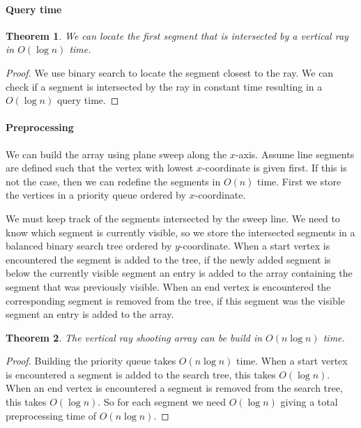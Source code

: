 \documentclass[10pt,a4paper,final,oneside,openany,article]{memoir}
\newtheorem{rayshooting}{Theorem}
\begin{document}
\paragraph{Query time}
\begin{rayshooting}
  We can locate the first segment that is intersected by a vertical ray in $O(\log n)$ time.
\end{rayshooting}
\begin{proof}
We use binary search to locate the segment closest to the ray. We can check if a segment is intersected by the ray in constant time resulting in a $O(\log n)$ query time.
\end{proof}


\paragraph{Preprocessing}
We can build the array using plane sweep along the $x$-axis. Assume line segments are defined such that the vertex with lowest $x$-coordinate is given first. If this is not the case, then we can redefine the segments in $O(n)$ time. First we store the vertices in a priority queue ordered by $x$-coordinate.

We must keep track of the segments intersected by the sweep line. We need to know which segment is currently visible, so we store the intersected segments in a balanced binary search tree ordered by $y$-coordinate.
When a start vertex is encountered the segment is added to the tree, if the newly added segment is below the currently visible segment an entry is added to the array containing the segment that was previously visible.
When an end vertex is encountered the corresponding segment is removed from the tree, if this segment was the visible segment an entry is added to the array.

\begin{rayshooting}
  The vertical ray shooting array can be build in $O(n \log n)$ time.
\end{rayshooting}
\begin{proof}
  Building the priority queue takes $O( n \log n)$ time. 
  When a start vertex is encountered a segment is added to the search tree, this takes $O(\log n)$. When an end vertex is encountered a segment is removed from the search tree, this takes $O(\log n)$. So for each segment we need $O(\log n)$ giving a total preprocessing time of $O(n \log n)$.
\end{proof}
\end{document}
